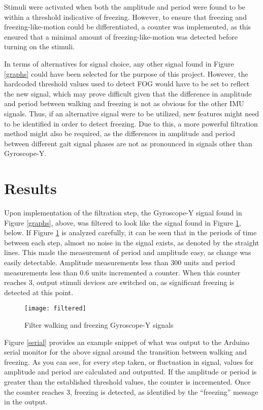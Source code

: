 \documentclass[titlepage]{article}
\begin{document}
\begin{doublespacing}
Stimuli were activated when both the amplitude and period were found to be within a threshold indicative of freezing. However, to ensure that freezing and freezing-like-motion could be differentiated, a counter was implemented, as this ensured that a minimal amount of freezing-like-motion was detected before turning on the stimuli.

    In terms of alternatives for signal choice, any other signal found in Figure \ref{graphs} could have been selected for the purpose of this project. However, the hardcoded threshold values used to detect FOG would have to be set to reflect the new signal, which may prove difficult given that the difference in amplitude and period between walking and freezing is not as obvious for the other IMU signals. Thus, if an alternative signal were to be utilized, new features might need to be identified in order to detect freezing. Due to this, a more powerful filtration method might also be required, as the differences in amplitude and period between different gait signal phases are not as pronounced in signals other than Gyroscope-Y.

\clearpage
\section{Results}

Upon implementation of the filtration step, the Gyroscope-Y signal found in Figure \ref{graphs}, above, was filtered to look like the signal found in Figure \ref{filtered}, below. If Figure \ref{filtered} is analyzed carefully, it can be seen that in the periods of time between each step, almost no noise in the signal exists, as denoted by the straight lines. This made the measurement of period and amplitude easy, as change was easily detectable. Amplitude measurements less than 300 units and period measurements less than 0.6 units incremented a counter. When this counter reaches 3, output stimuli devices are switched on, as significant freezing is detected at this point.

\begin{figure}[H]
	\texttt{[image: filtered]}
	\caption{Filter walking and freezing Gyroscope-Y signals}
	\label{filtered}
\end{figure}

Figure \ref{serial} provides an example snippet of what was output to the Arduino serial monitor for the above signal around the transition between walking and freezing. As you can see, for every step taken, or fluctuation in signal, values for amplitude and period are calculated and outputted. If the amplitude or period is greater than the established threshold values, the counter is incremented. Once the counter reaches 3, freezing is detected, as identified by the “freezing” message in the output.


\end{doublespacing}
\end{document}
